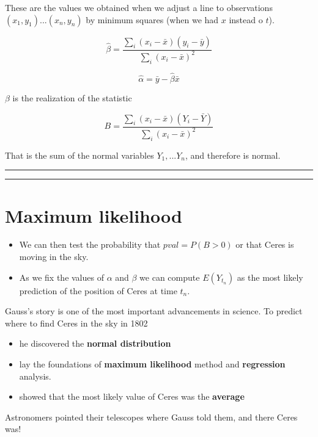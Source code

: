 \documentclass[
]{book}
\providecommand{\tightlist}{%
  \setlength{\itemsep}{0pt}\setlength{\parskip}{0pt}}
\begin{document}
These are the values we obtained when we adjust a line to observations
\((x_1, y_1)...(x_n, y_n)\) by minimum squares (when we had \(x\) instead o \(t\)).

\[\hat{\beta}=\frac{\sum_i (x_i-\bar{x})(y_i -\bar{y})}{\sum_i (x_i-\bar{x})^2}\]

\[\hat{\alpha} = \bar{y} - \hat{\beta} \bar{x}\]

\(\beta\) is the realization of the statistic

\[B=\frac{\sum_i (x_i-\bar{x})(Y_i -\bar{Y})}{\sum_i (x_i-\bar{x})^2}\]

That is the sum of the normal variables \(Y_1, ... Y_n\), and therefore is normal.

\begin{center}\rule{0.5\linewidth}{0.5pt}\end{center}

\begin{center}\rule{0.5\linewidth}{0.5pt}\end{center}

\hypertarget{maximum-likelihood-6}{%
\section{Maximum likelihood}\label{maximum-likelihood-6}}

\begin{itemize}
\item
  We can then test the probability that \(pval=P(B>0)\) or that Ceres is moving in the sky.
\item
  As we fix the values of \(\alpha\) and \(\beta\) we can compute \(E(Y_{t_n})\) as the most likely prediction of the position of Ceres at time \(t_n\).
\end{itemize}

Gauss's story is one of the most important advancements in science. To predict where to find Ceres in the sky in 1802

\begin{itemize}
\tightlist
\item
  he discovered the \textbf{normal distribution}
\item
  lay the foundations of \textbf{maximum likelihood} method and \textbf{regression} analysis.
\item
  showed that the most likely value of Ceres was the \textbf{average}
\end{itemize}

Astronomers pointed their telescopes where Gauss told them, and there Ceres was!
\end{document}

